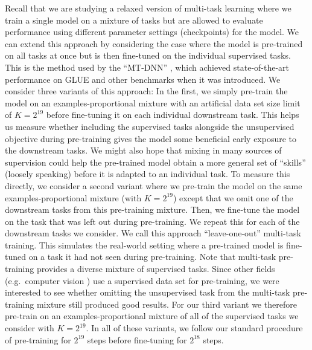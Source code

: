 Recall that we are studying a relaxed version of multi-task learning where we train a single model on a mixture of tasks but are allowed to evaluate performance using different parameter settings (checkpoints) for the model. We can extend this approach by considering the case where the model is pre-trained on all tasks at once but is then fine-tuned on the individual supervised tasks. This is the method used by the ``MT-DNN'' \citep{liu2015representation,liu2019multi}, which achieved state-of-the-art performance on GLUE and other benchmarks when it was introduced. We consider three variants of this approach: In the first, we simply pre-train the model on an examples-proportional mixture with an artificial data set size limit of $K=2^{19}$ before fine-tuning it on each individual downstream task. This helps us measure whether including the supervised tasks alongside the unsupervised objective during pre-training gives the model some beneficial early exposure to the downstream tasks. We might also hope that mixing in many sources of supervision could help the pre-trained model obtain a more general set of ``skills'' (loosely speaking) before it is adapted to an individual task. To measure this directly, we consider a second variant where we pre-train the model on the same examples-proportional mixture (with $K=2^{19}$) except that we omit one of the downstream tasks from this pre-training mixture. Then, we fine-tune the model on the task that was left out during pre-training. We repeat this for each of the downstream tasks we consider. We call this approach ``leave-one-out'' multi-task training. This simulates the real-world setting where a pre-trained model is fine-tuned on a task it had not seen during pre-training. Note that multi-task pre-training provides a diverse mixture of supervised tasks. Since other fields (e.g.\ computer vision \citep{oquab2014learning,jia2014caffe,huh2016makes,yosinski2014transferable}) use a supervised data set for pre-training, we were interested to see whether omitting the unsupervised task from the multi-task pre-training mixture still produced good results. For our third variant we therefore pre-train on an examples-proportional mixture of all of the supervised tasks we consider with $K = 2^{19}$. In all of these variants, we follow our standard procedure of pre-training for $2^{19}$ steps before fine-tuning for $2^{18}$ steps.

